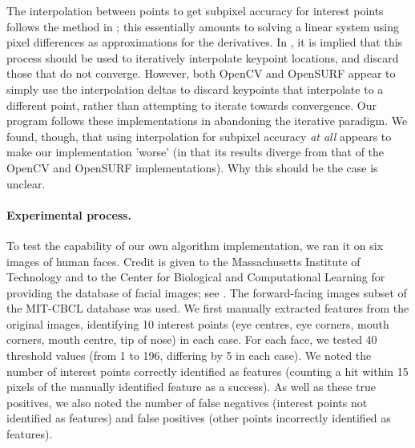 The interpolation between points to get subpixel accuracy for interest points follows the method in \cite{inv-features}; this essentially amounts to solving a linear system using pixel differences as approximations for the derivatives. In \cite{SURF}, it is implied that this process should be used to iteratively interpolate keypoint locations, and discard those that do not converge. However, both OpenCV and OpenSURF appear to simply use the interpolation deltas to discard keypoints that interpolate to a different point, rather than attempting to iterate towards convergence. Our program follows these implementations in abandoning the iterative paradigm. We found, though, that using interpolation for subpixel accuracy \emph{at all} appears to make our implementation 'worse' (in that its results diverge from that of the OpenCV and OpenSURF implementations). Why this should be the case is unclear.

\paragraph{Experimental process.}
To test the capability of our own algorithm implementation, we ran it on six images of human faces. Credit is given to the Massachusetts Institute of Technology and to the Center for Biological and Computational Learning for providing the database of facial images; see \cite{database}. The forward-facing images subset of the MIT-CBCL database was used. We first manually extracted features from the original images, identifying 10 interest points (eye centres, eye corners, mouth corners, mouth centre, tip of nose) in each case. 
For each face, we tested 40 threshold values (from 1 to 196, differing by 5 in each case). We noted the number of interest points correctly identified as features (counting a hit within 15 pixels of the manually identified feature as a success). As well as these true positives, we also noted the number of false negatives (interest points not identified as features) and false positives (other points incorrectly identified as features).




